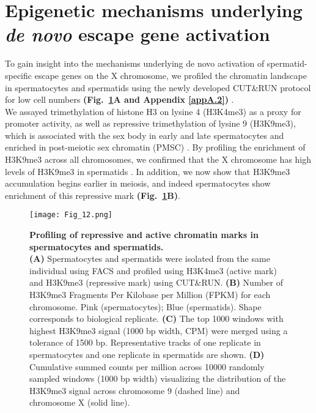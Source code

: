 \newpage

\section{Epigenetic mechanisms underlying \emph{de novo} escape gene activation}

To gain insight into the mechanisms underlying de novo activation of spermatid-specific escape genes on the X chromosome, we profiled the chromatin landscape in spermatocytes and spermatids using the newly developed CUT\&{}RUN protocol for low cell numbers \textbf{(Fig.~\ref{fig3:K9_global}A and Appendix \ref{appA.2})} \citep{Skene2018}. \\

We assayed trimethylation of histone H3 on lysine 4 (H3K4me3) as a proxy for promoter activity, as well as repressive trimethylation of lysine 9 (H3K9me3), which is associated with the sex body in early and late spermatocytes and enriched in post-meiotic sex chromatin (PMSC) \citep{Greaves2006, Tachibana2007}. By profiling the enrichment of H3K9me3 across all chromosomes, we confirmed that the X chromosome has high levels of H3K9me3 in spermatids \citep{Moretti2016}. In addition, we now show that H3K9me3 accumulation begins earlier in meiosis, and indeed spermatocytes show enrichment of this repressive mark \textbf{(Fig.~\ref{fig3:K9_global}B)}. 

\begin{figure}[!h]
\centering
\texttt{[image: Fig\_12.png]}
\caption[Chromatin profiling in spermatocytes and spermatids]{\textbf{Profiling of repressive and active chromatin marks in spermatocytes and spermatids.} \\
\textbf{(A)} Spermatocytes and spermatids were isolated from the same individual using FACS and profiled using H3K4me3 (active mark) and H3K9me3 (repressive mark) using CUT\&{}RUN. \textbf{(B)} Number of H3K9me3 Fragments Per Kilobase per Million (FPKM) for each chromosome. Pink (spermatocytes); Blue (spermatids). Shape corresponds to biological replicate. \textbf{(C)} The top 1000 windows with highest H3K9me3 signal (1000 bp width, CPM) were merged using a tolerance of 1500 bp. Representative tracks of one replicate in spermatocytes and one replicate in spermatids are shown. \textbf{(D)} Cumulative summed counts per million across 10000 randomly sampled windows (1000 bp width) visualizing the distribution of the H3K9me3 signal across chromosome 9 (dashed line) and chromosome X (solid line). 
}
\label{fig3:K9_global}
\end{figure}

